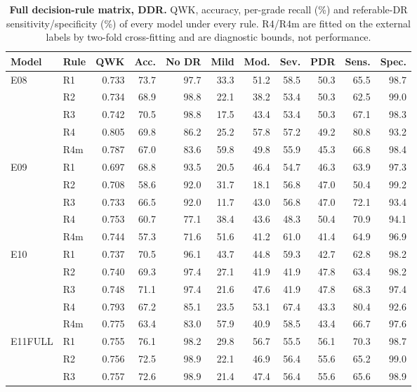 \begin{table}[h]
\caption{\textbf{Full decision-rule matrix, DDR.} QWK, accuracy, per-grade recall (\%) and referable-DR sensitivity/specificity (\%) of every model under every rule. R4/R4m are fitted on the external labels by two-fold cross-fitting and are diagnostic bounds, not performance.}\label{tab:rules_ddr}
\centering\scriptsize
\begin{tabular}{@{}llrrrrrrrrr@{}}
\toprule
Model & Rule & QWK & Acc. & No DR & Mild & Mod. & Sev. & PDR & Sens. & Spec. \\
\midrule
E08 & R1 & 0.733 & 73.7 & 97.7 & 33.3 & 51.2 & 58.5 & 50.3 & 65.5 & 98.7 \\
 & R2 & 0.734 & 68.9 & 98.8 & 22.1 & 38.2 & 53.4 & 50.3 & 62.5 & 99.0 \\
 & R3 & 0.742 & 70.5 & 98.8 & 17.5 & 43.4 & 53.4 & 50.3 & 67.1 & 98.3 \\
 & R4 & 0.805 & 69.8 & 86.2 & 25.2 & 57.8 & 57.2 & 49.2 & 80.8 & 93.2 \\
 & R4m & 0.787 & 67.0 & 83.6 & 59.8 & 49.8 & 55.9 & 45.3 & 66.8 & 98.4 \\
\addlinespace
E09 & R1 & 0.697 & 68.8 & 93.5 & 20.5 & 46.4 & 54.7 & 46.3 & 63.9 & 97.3 \\
 & R2 & 0.708 & 58.6 & 92.0 & 31.7 & 18.1 & 56.8 & 47.0 & 50.4 & 99.2 \\
 & R3 & 0.733 & 66.5 & 92.0 & 11.7 & 43.0 & 56.8 & 47.0 & 72.1 & 93.4 \\
 & R4 & 0.753 & 60.7 & 77.1 & 38.4 & 43.6 & 48.3 & 50.4 & 70.9 & 94.1 \\
 & R4m & 0.744 & 57.3 & 71.6 & 51.6 & 41.2 & 61.0 & 41.4 & 64.9 & 96.9 \\
\addlinespace
E10 & R1 & 0.737 & 70.5 & 96.1 & 43.7 & 44.8 & 59.3 & 42.7 & 62.8 & 98.2 \\
 & R2 & 0.740 & 69.3 & 97.4 & 27.1 & 41.9 & 41.9 & 47.8 & 63.4 & 98.2 \\
 & R3 & 0.748 & 71.1 & 97.4 & 21.6 & 47.6 & 41.9 & 47.8 & 68.3 & 97.4 \\
 & R4 & 0.793 & 67.2 & 85.1 & 23.5 & 53.1 & 67.4 & 43.3 & 80.4 & 92.6 \\
 & R4m & 0.775 & 63.4 & 83.0 & 57.9 & 40.9 & 58.5 & 43.4 & 66.7 & 97.6 \\
\addlinespace
E11FULL & R1 & 0.755 & 76.1 & 98.2 & 29.8 & 56.7 & 55.5 & 56.1 & 70.3 & 98.7 \\
 & R2 & 0.756 & 72.5 & 98.9 & 22.1 & 46.9 & 56.4 & 55.6 & 65.2 & 99.0 \\
 & R3 & 0.757 & 72.6 & 98.9 & 21.4 & 47.4 & 56.4 & 55.6 & 65.6 & 98.9 \\

\end{tabular}
\end{table}
